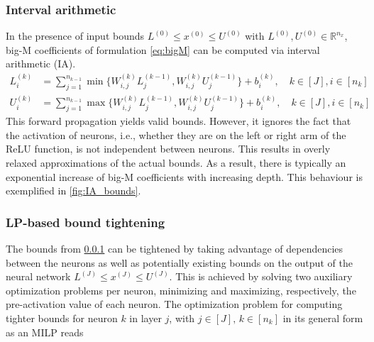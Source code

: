 \subsubsection{Interval arithmetic}\label{subsec:ia_bounds}
%
In the presence of input bounds $L^{(0)} \leq x^{(0)} \leq U^{(0)}$ with $L^{(0)}, U^{(0)} \in \mathbb{R}^{n_x}$, big-M coefficients of formulation \eqref{eq:bigM} can be computed via interval arithmetic (IA).
%
\begin{align}
    L^{(k)}_i &= \sum_{j=1}^{n_{k-1}} \min \{ W_{i,j}^{(k)} L_j^{(k-1)}, W_{i,j}^{(k)} U_j^{(k-1)} \} + b^{(k)}_i, \quad k \in [J],  i \in [n_k] \\
    U^{(k)}_i &= \sum_{j=1}^{n_{k-1}} \max \{ W_{i,j}^{(k)} L_j^{(k-1)}, W_{i,j}^{(k)} U_j^{(k-1)} \} + b^{(k)}_i, \quad k \in [J],  i \in [n_k] 
\end{align}
%
This forward propagation yields valid bounds. However, it ignores the fact that the activation of neurons, i.e., whether they are on the left or right arm of the ReLU function, is not independent between neurons. This results in overly relaxed approximations of the actual bounds. As a result, there is typically an exponential increase of big-M coefficients with increasing depth. This behaviour is exemplified in \vref{fig:IA_bounds}.


\subsubsection{LP-based bound tightening}\label{subsec:lr_bounds}

The bounds from \cref{subsec:ia_bounds} can be tightened by taking advantage of dependencies between the neurons as well as potentially existing bounds on the output of the neural network $L^{(J)} \leq x^{(J)} \leq U^{(J)}$. This is achieved by solving two auxiliary optimization problems per neuron, minimizing and maximizing, respectively, the pre-activation value of each neuron. The optimization problem for computing tighter bounds for neuron $k$ in layer $j$, with $j \in [J],\,k \in [n_k]$ in its general form as an MILP reads

